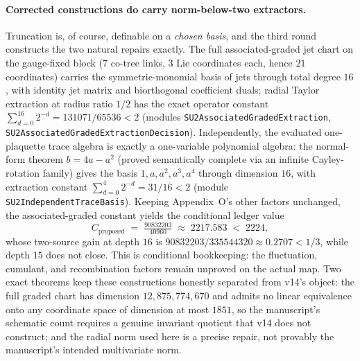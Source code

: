\documentclass[11pt]{article}
\theoremstyle{definition}
\begin{document}
\paragraph{Corrected constructions do carry norm-below-two extractors.}
Truncation is, of course, definable on a \emph{chosen basis}, and the third
round constructs the two natural repairs exactly. The full associated-graded
jet chart on the gauge-fixed block ($7$ co-tree links, $3$ Lie coordinates
each, hence $21$ coordinates) carries the symmetric-monomial basis of jets
through total degree $16$, with identity jet matrix and biorthogonal
coefficient duals; radial Taylor extraction at radius ratio $1/2$ has the
exact operator constant
$\sum_{d=0}^{16}2^{-d}=131071/65536<2$
(modules \texttt{SU2AssociatedGradedExtraction},
\texttt{SU2AssociatedGradedExtractionDecision}). Independently, the evaluated
one-plaquette trace algebra is exactly a one-variable polynomial algebra: the
normal-form theorem $b=4a-a^2$ (proved semantically complete via an infinite
Cayley-rotation family) gives the basis $1,a,a^2,a^3,a^4$ through dimension
$16$, with extraction constant $\sum_{d=0}^{4}2^{-d}=31/16<2$ (module
\texttt{SU2IndependentTraceBasis}). Keeping Appendix~O's other factors
unchanged, the associated-graded constant yields the conditional ledger value
\[
  C_{\mathrm{proposed}}
  \;=\; \tfrac{90832203}{40960} \;\approx\; 2217.583 \;<\; 2224,
\]
whose two-source gain at depth $16$ is
$90832203/335544320\approx0.2707<1/3$, while depth $15$ does not close. This
is conditional bookkeeping: the fluctuation, cumulant, and recombination
factors remain unproved on the actual map. Two exact theorems keep these
constructions honestly separated from v14's object: the full graded chart has
dimension $12{,}875{,}774{,}670$ and admits no linear equivalence onto any
coordinate space of dimension at most $1851$, so the manuscript's schematic
count requires a genuine invariant quotient that v14 does not construct; and
the radial norm used here is a precise repair, not provably the manuscript's
intended multivariate norm.
\end{document}
